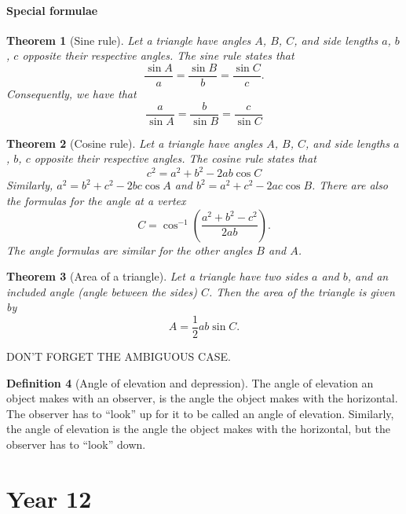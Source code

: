 \documentclass[12pt]{book}
\newtheorem{theo}{Theorem}[section]
\theoremstyle{definition}
\newtheorem{defi}[theo]{Definition}
\begin{document}
\subsection{Special formulae}
  \begin{theo}[Sine rule]
    Let a triangle have angles $A$, $B$, $C$, and side lengths $a$, $b$, $c$ opposite their respective angles. The sine rule
    states that
    \[\frac{\sin A}{a}=\frac{\sin B}{b} = \frac{\sin C}{c}.\]
    Consequently, we have that \[\frac{a}{\sin A}=\frac{b}{\sin B}=\frac{c}{\sin C}\]
  \end{theo}
  \begin{theo}[Cosine rule]
    Let a triangle have angles $A$, $B$, $C$, and side lengths $a$, $b$, $c$ opposite their respective angles. The cosine rule
    states that
    \[c^2=a^2+b^2-2ab\cos C\]
    Similarly, $a^2 = b^2+c^2-2bc\cos A$ and $b^2=a^2+c^2-2ac\cos B$. There are also the formulas for the angle at a vertex
    \[C=\cos^{-1}\left(\frac{a^2+b^2-c^2}{2ab}\right).\] The angle formulas are similar for the other angles $B$ and $A$.
  \end{theo}
  \begin{theo}[Area of a triangle]
    Let a triangle have two sides $a$ and $b$, and an included angle (angle between the sides) $C$. Then the area of the triangle
    is given by \[A=\frac{1}{2}ab\sin C.\]
  \end{theo}
  DON'T FORGET THE AMBIGUOUS CASE.
  \begin{defi}[Angle of elevation and depression]
    The angle of elevation an object makes with an observer, is the angle the object makes with the horizontal. The observer
    has to ``look'' up for it to be called an angle of elevation. Similarly, the angle of elevation is the angle the object makes
    with the horizontal, but the observer has to ``look'' down.
  \end{defi}
\part{Year 12}
\end{document}
